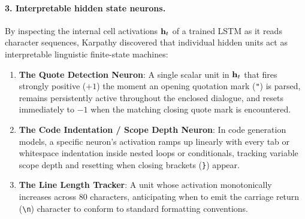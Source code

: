 \documentclass[../../main.tex]{subfiles}
\begin{document}
\paragraph{3. Interpretable hidden state neurons.}
By inspecting the internal cell activations $\mathbf{h}_t$ of a trained LSTM as it reads character sequences, Karpathy \cite{karpathy2015rnn} discovered that individual hidden units act as interpretable linguistic finite-state machines:
\begin{enumerate}
    \item \textbf{The Quote Detection Neuron}: A single scalar unit in $\mathbf{h}_t$ that fires strongly positive ($+1$) the moment an opening quotation mark (\texttt{"}) is parsed, remains persistently active throughout the enclosed dialogue, and resets immediately to $-1$ when the matching closing quote mark is encountered.
    \item \textbf{The Code Indentation / Scope Depth Neuron}: In code generation models, a specific neuron's activation ramps up linearly with every tab or whitespace indentation inside nested loops or conditionals, tracking variable scope depth and resetting when closing brackets (\texttt{\}}) appear.
    \item \textbf{The Line Length Tracker}: A unit whose activation monotonically increases across 80 characters, anticipating when to emit the carriage return (\texttt{\textbackslash n}) character to conform to standard formatting conventions.
\end{enumerate}
\end{document}
